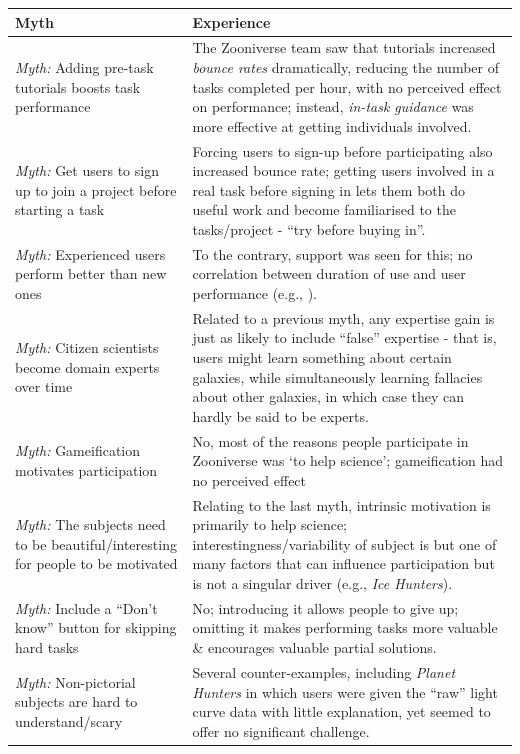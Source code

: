 \documentclass{sigchi}
\begin{document}
\begin{table}
\begin{center}
\begin{tabular}{p{4.5cm}p{13cm}}
Myth & Experience \\
\hline
\emph{Myth:} Adding pre-task tutorials boosts task performance & The Zooniverse team saw that tutorials increased \emph{bounce rates} dramatically, reducing the number of tasks completed per hour, with no perceived effect on performance; instead, \emph{in-task guidance} was more effective at getting individuals involved. \\
\hline
\emph{Myth:} Get users to sign up to join a project before starting a task & Forcing users to sign-up before participating also increased bounce rate; getting users involved in a real task before signing in lets them both do useful work and become familiarised to the tasks/project - ``try before buying in''. \\
\hline
\emph{Myth:} Experienced users perform better than new ones &  To the contrary, support was seen for this; no correlation between duration of use and user performance (e.g., \cite{simpson2013dynamic}). \\
\hline
\emph{Myth:} Citizen scientists become domain experts over time &  Related to a previous myth, any expertise gain is just as likely to include ``false'' expertise - that is, users might learn something about certain galaxies, while simultaneously learning fallacies about other galaxies, in which case they can hardly be said to be experts. \\
\hline
\emph{Myth:} Gameification motivates participation &  No, most of the reasons people participate in Zooniverse was `to help science'; gameification had no perceived effect \\
\hline
\emph{Myth:} The subjects need to be beautiful/interesting for people to be motivated & Relating to the last myth, intrinsic motivation is primarily to help science; interestingness/variability of subject is but one of many factors that can influence participation but is not a singular driver (e.g., \emph{Ice Hunters}). \\
\hline
\emph{Myth:} Include a ``Don't know'' button for skipping hard tasks &  No; introducing it allows people to give up; omitting it makes performing tasks more valuable \& encourages valuable partial solutions. \\
\hline
\emph{Myth:} Non-pictorial subjects are hard to understand/scary &  Several counter-examples, including \emph{Planet Hunters} in which users were given the ``raw'' light curve data with little explanation, yet seemed to offer no significant challenge. \\

\end{tabular}
\end{center}
\end{table}
\end{document}
